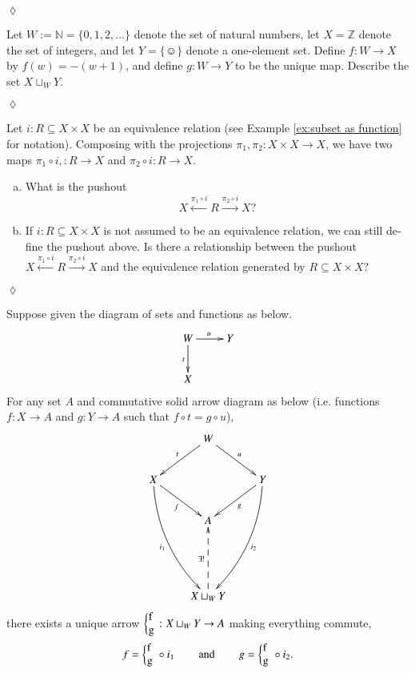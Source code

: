 \documentclass{book}
\def\ZZ{{\mathbb Z}}
\def\NN{{\mathbb N}}
\def\hsp{\hspace{.3in}}
\def\singleton{\{\smiley\}}
\def\to{\rightarrow}
\def\taking{\colon}
\def\ss{\subseteq}
\newcommand{\To}[1]{\xrightarrow{#1}}
\newcommand{\From}[1]{\xleftarrow{#1}}
\newcommand{\coprodmap}[2]{{\left\{\parbox{.1in}{#1\\#2}\right.}}
\newcommand{\po}[3]{\coprodmap{#1}{#2}}
\theoremstyle{theoremENG}
\theoremstyle{lemmaENG}
\newtheorem{lemmaENG}[subsubsection]{\begin{english}Lemma\end{english}}
\theoremstyle{propositionENG}
\theoremstyle{corollaryENG}
\theoremstyle{factENG}
\theoremstyle{remarkENG}
\theoremstyle{exampleENG}
\theoremstyle{warningENG}
\theoremstyle{questionENG}
\theoremstyle{guessENG}
\theoremstyle{answerENG}
\theoremstyle{constructionENG}
\theoremstyle{rulesENG}
\theoremstyle{excENG}
\newtheorem{excENG}[subsubsection]{\begin{english}Exercise\end{english}}
\theoremstyle{appENG}
\theoremstyle{definitionENG}
\theoremstyle{notationENG}
\theoremstyle{conjectureENG}
\theoremstyle{postulateENG}
\newenvironment{exerciseENG}{\begin{excENG}}{\hspace*{\fill}$\lozenge$\end{excENG}}
\theoremstyle{theoremRUS}
\theoremstyle{lemmaRUS}
\theoremstyle{propositionRUS}
\theoremstyle{corollaryRUS}
\theoremstyle{factRUS}
\theoremstyle{remarkRUS}
\theoremstyle{exampleRUS}
\theoremstyle{warningRUS}
\theoremstyle{questionRUS}
\theoremstyle{guessRUS}
\theoremstyle{answerRUS}
\theoremstyle{constructionRUS}
\theoremstyle{rulesRUS}
\theoremstyle{excRUS}
\theoremstyle{appRUS}
\theoremstyle{definitionRUS}
\theoremstyle{notationRUS}
\theoremstyle{conjectureRUS}
\theoremstyle{postulateRUS}
\def\sexc{\begin{enumerate}[a.)]\setlength{\itemsep}{.1cm}\setlength{\parskip}{.1cm}\item}
\def\next{\item}
\def\endsexc{\end{enumerate}}
\begin{document}
\begin{english}
\begin{exerciseENG}
\begin{russian} \end{russian}

\end{exerciseENG}

\begin{exerciseENG}

Let $W:=\NN=\{0,1,2,\ldots\}$ denote the set of natural numbers, let $X=\ZZ$ denote the set of integers, and let $Y=\singleton$ denote a one-element set. Define $f\taking W\to X$ by $f(w)= -(w+1)$, and define $g\taking W\to Y$ to be the unique map. Describe the set $X\sqcup_WY$.

\begin{russian} \end{russian}

\end{exerciseENG}

\begin{exerciseENG}

Let $i\taking R\ss X\times X$ be an equivalence relation (see Example \ref{ex:subset as function} for notation). Composing with the projections $\pi_1,\pi_2\taking X\times X\to X$, we have two maps $\pi_1\circ i,\taking R\to X$ and $\pi_2\circ i\taking R\to X$. 
\sexc What is the pushout $$X\From{\pi_1\circ i}R\To{\pi_2\circ i}X?$$ 
\next If $i\taking R\ss X\times X$ is not assumed to be an equivalence relation, we can still define the pushout above. Is there a relationship between the pushout $X\From{\pi_1\circ i}R\To{\pi_2\circ i}X$ and the equivalence relation generated by $R\ss X\times X$?
\endsexc

\begin{russian} \end{russian}

\end{exerciseENG}


\begin{lemmaENG}\label{lemma:up for po}

Suppose given the diagram of sets and functions as below.
\begin{align*}
\xymatrix{W\ar[r]^u\ar[d]_t&Y\\
X}
\end{align*}
For any set $A$ and commutative solid arrow diagram as below (i.e. functions $f\taking X\to A$ and $g\taking Y\to A$ such that $f\circ t=g\circ u$), 
\begin{align}\label{dia:universal property of po}
\xymatrix{
&W\ar[dr]^u\ar[dl]_t\\
X\ar@/_1pc/[dddr]_{i_1}\ar[rd]_f&&Y\ar@/^1pc/[dddl]^{i_2}\ar[dl]^g\\
&A\\\\
&X\sqcup_WY\ar@{-->}[uu]^{\exists!}
}
\end{align}
there exists a unique arrow $\po{f}{g}{W}\taking X\sqcup_WY\to A$ making everything commute, $$f=\po{f}{g}{W}\circ i_1\hsp\text{and}\hsp g=\po{f}{g}{W}\circ i_2.$$


\end{lemmaENG}
\end{english}
\end{document}
